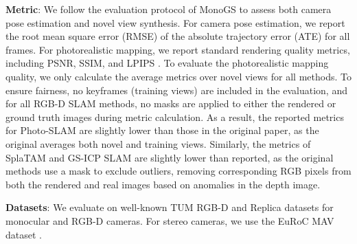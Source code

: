 \noindent\textbf{Metric}: We follow the evaluation protocol of MonoGS \cite{MonoGS2024} to assess both camera pose estimation and novel view synthesis. For camera pose estimation, we report the root mean square error (RMSE) of the absolute trajectory error (ATE) \cite{grupp2017evo} for all frames. For photorealistic mapping, we report standard rendering quality metrics, including PSNR, SSIM, and LPIPS \cite{lpips}. To evaluate the photorealistic mapping quality, we only calculate the average metrics over novel views for all methods. To ensure fairness, no keyframes (training views) are included in the evaluation, and for all RGB-D SLAM methods, no masks are applied to either the rendered or ground truth images during metric calculation. As a result, the reported metrics for Photo-SLAM \cite{Photo-SLAM2024} are slightly lower than those in the original paper, as the original averages both novel and training views. Similarly, the metrics of SplaTAM  \cite{SplaTAM2024} and GS-ICP SLAM \cite{GS-ICPSLAM2024} are slightly lower than reported, as the original methods use a mask to exclude outliers, removing corresponding RGB pixels from both the rendered and real images based on anomalies in the depth image.

\noindent\textbf{Datasets}: We evaluate on well-known TUM RGB-D \cite{TUMRGB-D2012} and Replica \cite{Replica2019}  datasets for monocular and RGB-D cameras. For stereo cameras, we use the EuRoC MAV dataset \cite{EuRoC2016}.


